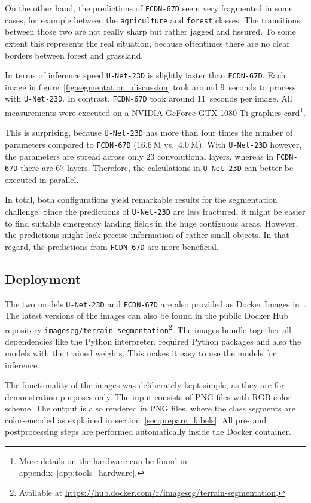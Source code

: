 On the other hand, the predictions of \texttt{FCDN-67D} seem very fragmented in some cases, for example between the \texttt{agriculture} and \texttt{forest} classes. The transitions between those two are not really sharp but rather jagged and fissured. To some extent this represents the real situation, because oftentimes there are no clear borders between forest and grassland.

In terms of inference speed \texttt{U-Net-23D} is slightly faster than \texttt{FCDN-67D}. Each image in figure~\ref{fig:segmentation_discussion} took around $9$~seconds to process with \texttt{U-Net-23D}. In contrast, \texttt{FCDN-67D} took around $11$~seconds per image. All measurements were executed on a NVIDIA GeForce GTX 1080 Ti graphics card\footnote{More details on the hardware can be found in appendix~\ref{app:tools_hardware}.}.

This is surprising, because \texttt{U-Net-23D} has more than four times the number of parameters compared to \texttt{FCDN-67D} ($16.6~\text{M}$ vs.\ $4.0~\text{M}$). With \texttt{U-Net-23D} however, the parameters are spread across only $23$ convolutional layers, whereas in \texttt{FCDN-67D} there are $67$ layers. Therefore, the calculations in \texttt{U-Net-23D} can better be executed in parallel.

In total, both configurations yield remarkable results for the segmentation challenge. Since the predictions of \texttt{U-Net-23D} are less fractured, it might be easier to find suitable emergency landing fields in the huge contiguous areas. However, the predictions might lack precise information of rather small objects. In that regard, the predictions from \texttt{FCDN-67D} are more beneficial.

\subsection{Deployment}
The two models \texttt{U-Net-23D} and \texttt{FCDN-67D} are also provided as Docker Images in~\cite{thesis-code20}. The latest versions of the images can also be found in the public Docker Hub repository \texttt{imageseg/terrain-segmentation}\footnote{Available at \url{https://hub.docker.com/r/imageseg/terrain-segmentation}.}. The images bundle together all dependencies like the Python interpreter, required Python packages and also the models with the trained weights. This makes it easy to use the models for inference.

The functionality of the images was deliberately kept simple, as they are for demonstration purposes only. The input consists of PNG files with RGB color scheme. The output is also rendered in PNG files, where the class segments are color-encoded as explained in section~\ref{sec:prepare_labels}. All pre- and postprocessing steps are performed automatically inside the Docker container.


